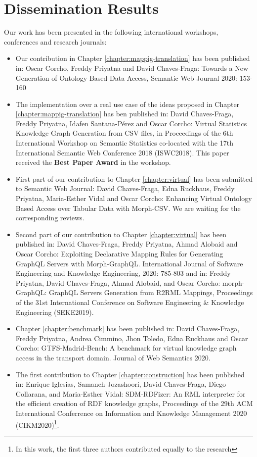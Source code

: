 \section{Dissemination Results}
\label{sec:disresults}

Our work has been presented in the following international workshops, conferences and research journals:

\begin{itemize}
    \item Our contribution in Chapter \ref{chapter:mappig-translation} has been published in: Oscar Corcho, Freddy Priyatna and David Chaves-Fraga: Towards a New Generation of Ontology Based Data Access, Semantic Web Journal 2020: 153-160
    \item The implementation over a real use case of the ideas proposed in Chapter  \ref{chapter:mappig-translation} has ben published in: David Chaves-Fraga, Freddy Priyatna, Idafen Santana-Pérez and Oscar Corcho: Virtual Statistics Knowledge Graph Generation from CSV files, in Proceedings of the 6th International Workshop on Semantic Statistics co-located with the 17th International Semantic Web Conference 2018 (ISWC2018). This paper received the \textbf{Best Paper Award} in the workshop.
    \item First part of our contribution to Chapter \ref{chapter:virtual} has been submitted to Semantic Web Journal: David Chaves-Fraga, Edna Ruckhaus, Freddy Priyatna, Maria-Esther Vidal and Oscar Corcho: Enhancing Virtual Ontology Based Access over Tabular Data with Morph-CSV. We are waiting for the corresponding reviews.
    \item Second part of our contribution to Chapter \ref{chapter:virtual} has been published in: David Chaves-Fraga, Freddy Priyatna, Ahmad Alobaid and Oscar Corcho: Exploiting Declarative Mapping Rules for Generating GraphQL Servers with Morph-GraphQL. International Journal of Software Engineering and Knowledge Engineering, 2020: 785-803 and in: Freddy Priyatna, David Chaves-Fraga, Ahmad Alobaid, and Oscar Corcho: morph-GraphQL: GraphQL Servers Generation from R2RML Mappings, Proceedings of the 31st International Conference on Software Engineering \& Knowledge Engineering (SEKE2019).
    \item Chapter \ref{chapter:benchmark} has been published in: David Chaves-Fraga, Freddy Priyatna, Andrea Cimmino, Jhon Toledo, Edna Ruckhaus and Oscar Corcho: GTFS-Madrid-Bench: A benchmark for virtual knowledge graph access in the transport domain. Journal of Web Semantics 2020.
    \item The first contribution to Chapter \ref{chapter:construction} has been published in: Enrique Iglesias, Samaneh Jozashoori, David Chaves-Fraga, Diego Collarana, and Maria-Esther Vidal: SDM-RDFizer: An RML interpreter for the efficient creation of RDF knowledge graphs, Proceedings of the 29th ACM International Conferrence on Information and Knowledge Management 2020 (CIKM2020)\footnote{In this work, the first three authors contributed equally to the research}.

\end{itemize}
